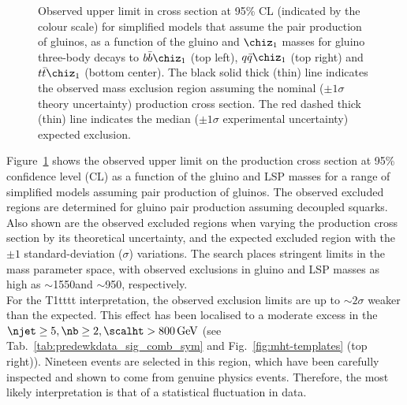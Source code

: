 \begin{figure}[thp!]
\begin{center}
    \caption{Observed upper limit in cross section at 95\% CL
      (indicated by the colour scale) for simplified models that
      assume the pair production of gluinos, as a function of the
      gluino and $\chiz_{1}$ masses for gluino three-body decays to
      $b\bar{b}\chiz_{1}$ (top left), $q\bar{q}\chiz_{1}$ (top right) and $t\bar{t}\chiz_{1}$ (bottom center). 
      The black solid thick (thin) line indicates the observed mass
      exclusion region assuming the nominal (${\pm}1 \sigma$ theory
      uncertainty) production cross section. The red dashed thick
      (thin) line indicates the median (${\pm}1 \sigma$ experimental
      uncertainty) expected exclusion.
      \label{fig:limits-sms} }
  \end{center}
\end{figure}

Figure~\ref{fig:limits-sms} shows the observed upper limit on the
production cross section at 95\% confidence level (CL) as a function
of the gluino and LSP masses for a range of simplified models assuming
pair production of gluinos. The observed excluded regions are
determined for gluino pair production assuming decoupled squarks. Also
shown are the observed excluded regions when varying the production
cross section by its theoretical uncertainty, and the expected
excluded region with the ${\pm}1$ standard-deviation ($\sigma$)
variations. The search places stringent limits in the mass parameter
space, with observed exclusions in gluino and LSP masses as high as
$\sim$1550\gev and $\sim$950\gev, respectively. \\
For the T1tttt interpretation, the observed exclusion limits are up to $\sim 2\sigma$ weaker 
than the expected. This effect has been localised to a moderate 
excess in the $\njet\geq5, \nb\geq2, \scalht > 800 \, \mathrm{GeV}$ 
(see Tab.~\ref{tab:predewkdata_sig_comb_sym} and Fig.~\ref{fig:mht-templates} (top right)). 
Nineteen events are selected in this region, which have been 
carefully inspected and shown to come from genuine physics events. 
Therefore, the most likely interpretation is that of a statistical fluctuation in data. 


